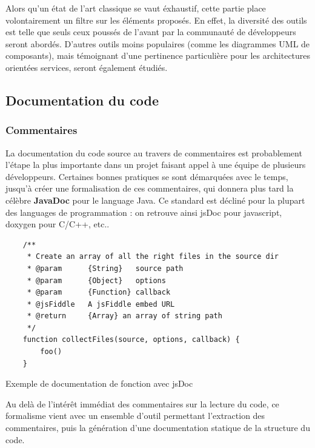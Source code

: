Alors qu'un état de l'art classique se vaut éxhaustif, cette partie place volontairement un filtre sur
les éléments proposés. En effet, la diversité des outils est telle que seuls ceux poussés de
l'avant par la communauté de développeurs seront abordés.
D'autres outils moins populaires (comme les diagrammes UML de composants), mais témoignant d'une pertinence
particulière pour les architectures orientées services, seront également étudiés.

\subsection{Documentation du code}
    \subsubsection{Commentaires}
La documentation du code source au travers de commentaires est probablement l'étape la plus
importante dans un projet faisant appel à une équipe de plusieurs développeurs.
Certaines bonnes pratiques se sont démarquées avec le temps, jusqu'à créer une formalisation de
ces commentaires, qui donnera plus tard la célèbre \textbf{JavaDoc} pour le language Java.
Ce standard est décliné pour la plupart des languages de programmation : on retrouve ainsi
jsDoc pour javascript, doxygen pour C/C++, etc..

\begin{listing}[ht]
    \begin{verbatim}
    /**
     * Create an array of all the right files in the source dir
     * @param      {String}   source path
     * @param      {Object}   options
     * @param      {Function} callback
     * @jsFiddle   A jsFiddle embed URL
     * @return     {Array} an array of string path
     */
    function collectFiles(source, options, callback) {
        foo()
    }
    \end{verbatim}
    \caption{Exemple de documentation de fonction avec jsDoc}
\end{listing}

Au delà de l'intérêt immédiat des commentaires sur la lecture du code, ce formalisme vient avec
un ensemble d'outil permettant l'extraction des commentaires, puis la génération d'une documentation
statique de la structure du code.

